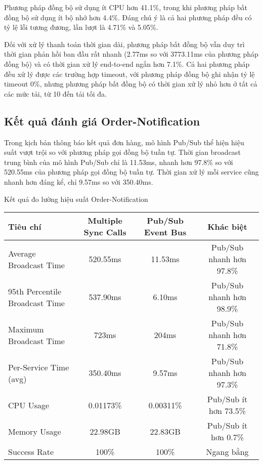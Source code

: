 Phương pháp đồng bộ sử dụng ít CPU hơn 41.1\%, trong khi phương pháp bất đồng bộ sử dụng ít bộ nhớ hơn 4.4\%. Đáng chú ý là cả hai phương pháp đều có tỷ lệ lỗi tương đương, lần lượt là 4.71\% và 5.05\%.

Đối với xử lý thanh toán thời gian dài, phương pháp bất đồng bộ vẫn duy trì thời gian phản hồi ban đầu rất nhanh (2.77ms so với 3773.11ms của phương pháp đồng bộ) và có thời gian xử lý end-to-end ngắn hơn 7.1\%. Cả hai phương pháp đều xử lý được các trường hợp timeout, với phương pháp đồng bộ ghi nhận tỷ lệ timeout 0\%, nhưng phương pháp bất đồng bộ có thời gian xử lý nhỏ hơn ở tất cả các mức tải, từ 10 đến tải tối đa.

\subsection{Kết quả đánh giá Order-Notification}
Trong kịch bản thông báo kết quả đơn hàng, mô hình Pub/Sub thể hiện hiệu suất vượt trội so với phương pháp gọi đồng bộ tuần tự. Thời gian broadcast trung bình của mô hình Pub/Sub chỉ là 11.53ms, nhanh hơn 97.8\% so với 520.55ms của phương pháp gọi đồng bộ tuần tự. Thời gian xử lý mỗi service cũng nhanh hơn đáng kể, chỉ 9.57ms so với 350.40ms.

\begin{table}[h]{Kết quả đo lường hiệu suất Order-Notification}
    \centering
    {\setlength{\arrayrulewidth}{1pt}
    \renewcommand{\arraystretch}{1.5}
    \begin{tabular}{|l|c|c|c|}
        \hline
        \textbf{Tiêu chí}              & \textbf{Multiple Sync Calls} & \textbf{Pub/Sub Event Bus} & \textbf{Khác biệt}       \\
        \hline
        Average Broadcast Time         & 520.55ms                     & 11.53ms                    & Pub/Sub nhanh hơn 97.8\% \\
        95th Percentile Broadcast Time & 537.90ms                     & 6.10ms                     & Pub/Sub nhanh hơn 98.9\% \\
        Maximum Broadcast Time         & 723ms                        & 204ms                      & Pub/Sub nhanh hơn 71.8\% \\
        Per-Service Time (avg)         & 350.40ms                     & 9.57ms                     & Pub/Sub nhanh hơn 97.3\% \\
        CPU Usage                      & 0.01173\%                    & 0.00311\%                  & Pub/Sub ít hơn 73.5\%    \\
        Memory Usage                   & 22.98GB                      & 22.83GB                    & Pub/Sub ít hơn 0.7\%     \\
        Success Rate                   & 100\%                        & 100\%                      & Ngang bằng               \\
        \hline
    \end{tabular}}
\end{table}

